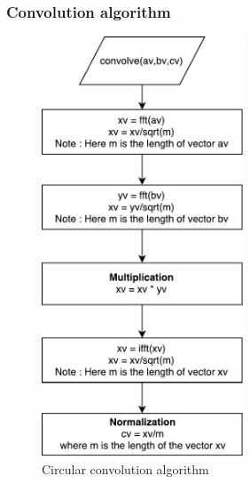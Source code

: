 \subsubsection{Convolution algorithm}
\begin{figure}[h]
	\centering
	\includegraphics[width=6cm]{./algorithms/fft/figures/convolution.pdf}
	\caption{Circular convolution algorithm}\label{convolution}
\end{figure}





\newpage
